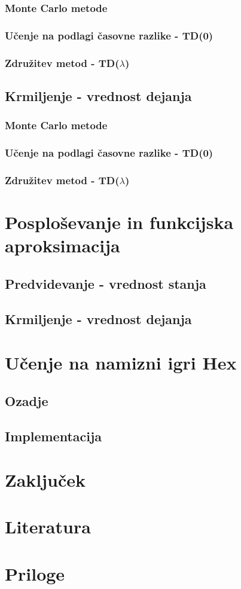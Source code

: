 \documentclass[a4paper, oneside, 12pt]{article}
\begin{document}
\subsubsection{Monte Carlo metode}
\subsubsection{Učenje na podlagi časovne razlike - TD(0)}
\subsubsection{Združitev metod - TD($\lambda$)}
\subsection{Krmiljenje - vrednost dejanja}
\subsubsection{Monte Carlo metode}
\subsubsection{Učenje na podlagi časovne razlike - TD(0)}
\subsubsection{Združitev metod - TD($\lambda$)}
\newpage

\section{Posploševanje in funkcijska aproksimacija}
\subsection{Predvidevanje - vrednost stanja}
\subsection{Krmiljenje - vrednost dejanja}
\newpage

\section{Učenje na namizni igri Hex}
\subsection{Ozadje}
\subsection{Implementacija}
\newpage

\section{Zaključek}
\newpage

\section{Literatura}
\newpage

\section{Priloge}
\newpage
\end{document}
